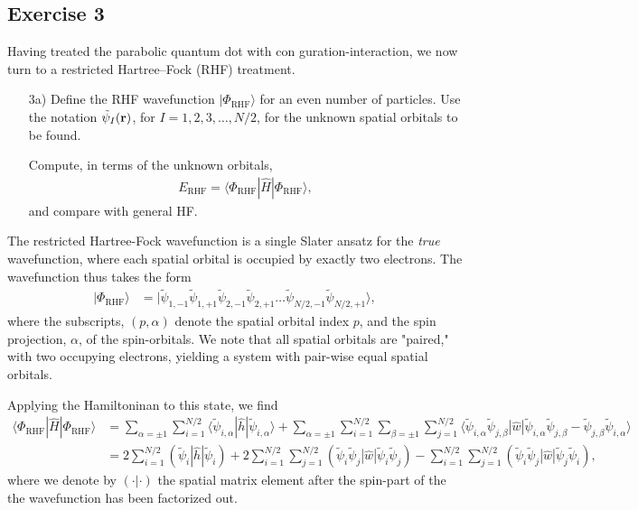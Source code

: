 \documentclass[a4paper]{article}
\newcommand{\nn}{\nonumber}
\begin{document}
\subsection*{Exercise 3}
Having treated the parabolic quantum dot with con guration-interaction, we now turn to a restricted Hartree–Fock (RHF) treatment.
\begin{exframe}
\begin{itemize}
  \item[3a)] Define the RHF wavefunction $|\Phi_\text{RHF}\rangle$ for an even number of particles. Use the notation $\tilde{\psi}_I({\bf r})$, for $I=1,2,3,\dots,N/2$, for the unknown spatial orbitals to be found. 

  Compute, in terms of the unknown orbitals, 
  \begin{align}
  E_\text{RHF} = \langle \Phi_\text{RHF} | \hat{H} | \Phi_\text{RHF}\rangle,
  \end{align}
  and compare with general HF.
\end{itemize}
\end{exframe}
The restricted Hartree-Fock wavefunction is a single Slater ansatz for the \emph{true} wavefunction, where each spatial orbital is occupied by exactly two electrons. The wavefunction thus takes the form
\begin{align}
|\Phi_\text{RHF}\rangle &= |\tilde{\psi}_{1,-1}\tilde{\psi}_{1,+1} \tilde{\psi}_{2,-1}\tilde{\psi}_{2,+1}\dots \tilde{\psi}_{N/2,-1}\tilde{\psi}_{N/2,+1} \rangle,
\end{align}
where the subscripts, $(p, \alpha)$ denote the spatial orbital index $p$, and the spin projection, $\alpha$, of the spin-orbitals. We note that all spatial orbitals are "paired," with two occupying electrons, yielding a system with pair-wise equal spatial orbitals.

Applying the Hamiltoninan to this state, we find
\begin{align}
\langle \Phi_\text{RHF} | \hat{H} | \Phi_\text{RHF} \rangle &= \sum_{\alpha=\pm1} \sum_{i=1}^{N/2} \langle \tilde{\psi}_{i,\alpha} | \hat{h} | \tilde{\psi}_{i,\alpha}\rangle + \sum_{\alpha=\pm1}\sum_{i=1}^{N/2}\sum_{\beta=\pm1}\sum_{j=1}^{N/2} \langle \tilde{\psi}_{i,\alpha} \tilde{\psi}_{j,\beta} | \hat{w} | \tilde{\psi}_{i,\alpha} \tilde{\psi}_{j,\beta} - \tilde{\psi}_{j,\beta}\tilde{\psi}_{i,\alpha}\rangle \nn\\
%
&= 2\sum_{i=1}^{N/2} (\tilde{\psi}_i | \hat{h} | \tilde{\psi}_i) + 2\sum_{i=1}^{N/2}\sum_{j=1}^{N/2} (\tilde{\psi}_i \tilde{\psi}_j | \hat{w} | \tilde{\psi}_i \tilde{\psi}_j) -  \sum_{i=1}^{N/2}\sum_{j=1}^{N/2}(\tilde{\psi}_i \tilde{\psi}_j | \hat{w} | \tilde{\psi}_j\tilde{\psi}_i),\label{eq:7}
\end{align}
where we denote by $(\cdot|\cdot)$ the spatial matrix element after the spin-part of the the wavefunction has been factorized out.
\end{document}
